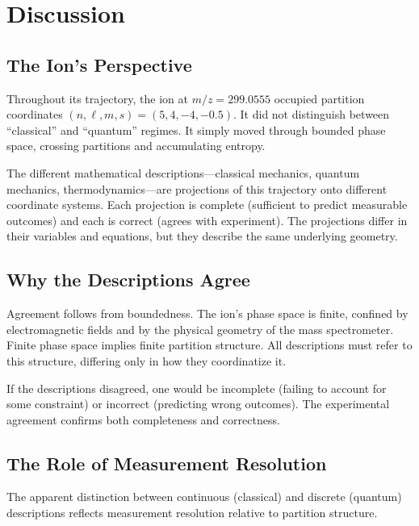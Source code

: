 \documentclass[12pt,a4paper]{article}
\theoremstyle{remark}
\begin{document}
\section{Discussion}
\label{sec:discussion}

\subsection{The Ion's Perspective}

Throughout its trajectory, the ion at $m/z = 299.0555$ occupied partition coordinates $(n, \ell, m, s) = (5, 4, -4, -0.5)$. It did not distinguish between ``classical'' and ``quantum'' regimes. It simply moved through bounded phase space, crossing partitions and accumulating entropy.

The different mathematical descriptions---classical mechanics, quantum mechanics, thermodynamics---are projections of this trajectory onto different coordinate systems. Each projection is complete (sufficient to predict measurable outcomes) and each is correct (agrees with experiment). The projections differ in their variables and equations, but they describe the same underlying geometry.

\subsection{Why the Descriptions Agree}

Agreement follows from boundedness. The ion's phase space is finite, confined by electromagnetic fields and by the physical geometry of the mass spectrometer. Finite phase space implies finite partition structure. All descriptions must refer to this structure, differing only in how they coordinatize it.

If the descriptions disagreed, one would be incomplete (failing to account for some constraint) or incorrect (predicting wrong outcomes). The experimental agreement confirms both completeness and correctness.

\subsection{The Role of Measurement Resolution}

The apparent distinction between continuous (classical) and discrete (quantum) descriptions reflects measurement resolution relative to partition structure.
\end{document}
